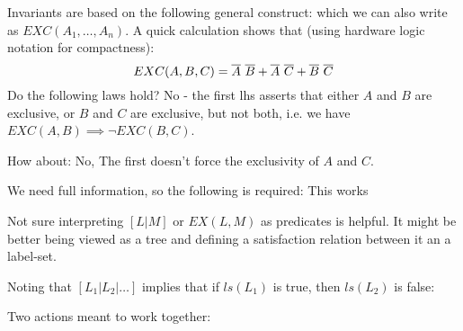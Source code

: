 Invariants are based on the following general construct:
which we can also write as $EXC(A_1,\dots,A_n)$.
A quick calculation shows that
(using hardware logic notation for compactness):
\[
 EXC(A,B,C) = \overline{A} ~ \overline{B}  + \overline{A} ~ \overline{C} + \overline{B} ~ \overline{C}
\]
Do the following laws hold?
No - the first lhs asserts that either $A$ and $B$ are exclusive,
or $B$ and $C$ are exclusive, but not both,
i.e. we have $EXC(A,B) \implies \lnot EXC(B,C)$.

How about:
No, The first doesn't force the exclusivity of $A$ and $C$.

We need full information, so the following is required:
This works

Not sure interpreting $[L|M]$ or $EX(L,M)$ as predicates is helpful.
It might be better being viewed as a tree and defining a satisfaction relation
between it an a label-set.



Noting that $[L_1|L_2|\dots]$ implies that if $ls(L_1)$ is true,
then $ls(L_2)$ is false:


Two actions meant to work together:

